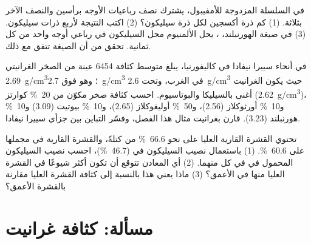 \begin{exercise}[$\star\star\star$]\label{exo:g11:minerals:13}
في السلسلة المزدوجة للأمفيبول، يشترك نصف رباعيات الأوجه برأسين
والنصف الآخر بثلاثة. (1) كم ذرة أكسجين لكل ذرة سيليكون؟ (2) اكتب
النتيجة لأربع ذرات سيليكون. (3) في صيغة الهورنبلند،
، يحل الألمنيوم محل السيليكون في
رباعي أوجه واحد من كل ثمانية. تحقق من أن الصيغة تتفق مع ذلك.
\end{exercise}

\begin{exercise}[$\star\star\star$]\label{exo:g11:minerals:14}
في أنحاء سييرا نيفادا في كاليفورنيا، يبلغ متوسط كثافة \num{6454} عينة من الصخر الغرانيتي
\qty{2.69}{g/cm^3}؛ وهو فوق \qty{2.7}{g/cm^3} في
الغرب، وتحت \qty{2.6}{g/cm^3} حيث يكون الغرانيت أغنى بالسيليكا
والبوتاسيوم. احسب كثافة صخر مكوّن من \qty{20}{\percent} كوارتز
(\qty{2.62}{g/cm^3})، و\qty{10}{\percent} أورثوكلاز (\qty{2.56}{})،
و\qty{50}{\percent} أوليغوكلاز (\qty{2.65}{})، و\qty{10}{\percent} بيوتيت
(\qty{3.09}{}) و\qty{10}{\percent} هورنبلند (\qty{3.23}{}). قارن
بغرانيت مثال هذا الفصل، وفسّر التباين
بين جزأي سييرا نيفادا.
\end{exercise}

\begin{exercise}[$\star\star\star$]\label{exo:g11:minerals:15}
تحتوي القشرة القارية العليا على نحو \qty{66.6}{\percent} من 
كتلةً، والقشرة القارية في مجملها على \qty{60.6}{\percent}. (1) باستعمال
نصيب السيليكون في  (\qty{46.7}{\percent})، احسب نصيب
السيليكون المحمول في  في كل منهما. (2) أي المعادن تتوقع أن
تكون أكثر شيوعًا في القشرة العليا منها في الأعمق؟ (3) ماذا يعني هذا
بالنسبة إلى كثافة القشرة العليا مقارنة بالقشرة الأعمق؟
\end{exercise}

\section{مسألة: كثافة غرانيت}


